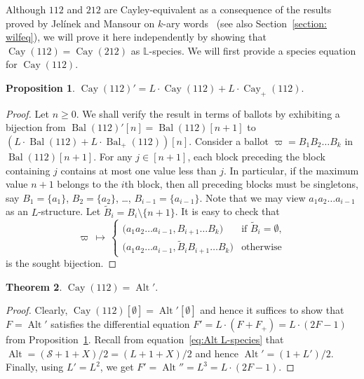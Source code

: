 \documentclass[a4paper, 11pt]{article}
\DeclareMathOperator{\Bal}{Bal}
\DeclareMathOperator{\Cay}{Cay}
\newcommand{\LL}{\mathbb{L}}
\DeclareMathOperator{\Alt}{Alt}
\newcommand{\Sym}{\mathcal{S}}
\theoremstyle{definition}
\newtheorem{theorem}{Theorem}[section]
\newtheorem{proposition}[theorem]{Proposition}
\begin{document}
Although $112$ and $212$ are Cayley-equivalent as a consequence of the results
proved by Jel\'inek and Mansour on $k$-ary words~\cite{k-ary} (see also
Section~\ref{section: wilfeq}), we will prove it here independently by
showing that $\Cay(112) = \Cay(212)$ as $\LL$-species. We will first
provide a species equation for $\Cay(112)$.

\begin{proposition}\label{prop: species equation Cay(112)}
$\Cay(112)' = L \cdot \Cay(112) + L \cdot \Cay_+(112)$. 
\end{proposition}

\begin{proof}
  Let $n\geq 0$.  We shall verify the result in terms of ballots by
  exhibiting a bijection from $\Bal(112)'[n]=\Bal(112)[n+1]$ to
  $(L \cdot \Bal(112) + L \cdot \Bal_+(112))[n]$.  Consider a ballot
  $\varpi=B_1B_2\ldots B_k$ in $\Bal(112)[n+1]$.  For any $j\in [n+1]$,
  each block preceding the block containing $j$ contains at most one
  value less than $j$. In particular, if the maximum value $n+1$ belongs
  to the $i$th block, then all preceding blocks must
  be singletons, say $B_1=\{a_1\}$, $B_2=\{a_2\}$, \dots,
  $B_{i-1}=\{a_{i-1}\}$. Note that we may view $a_1a_2\dots a_{i-1}$ as
  an $L$-structure. Let $\tilde{B}_i = B_i\setminus \{n+1\}$.  It is easy
  to check that
  \[
    \varpi \,\longmapsto\,
    \begin{cases}
      \bigl(a_1a_2\dots a_{i-1}, B_{i+1}\dots B_k \bigr) & \text{if $\tilde{B}_i=\emptyset$},\\
      \bigl(a_1a_2\dots a_{i-1}, \tilde{B}_iB_{i+1}\dots B_k \bigr) & \text{otherwise}
    \end{cases}
  \]
  is the sought bijection.
\end{proof}

\begin{theorem}\label{thm:species 112}
  $\Cay(112) = \Alt'$.
\end{theorem}
\begin{proof}
  Clearly, $\Cay(112)[\emptyset] = \Alt'[\emptyset]$ and hence it suffices
  to show that $F=\Alt'$ satisfies the differential equation
  $F' = L\cdot (F+F_+)=L\cdot (2F-1)$ from Proposition~\ref{prop: species equation Cay(112)}. 
  Recall from equation~\eqref{eq:Alt L-species} that
  $\Alt = (\Sym + 1 + X)/2 = (L + 1 + X)/2$ and hence $\Alt' = (1+L')/2$.
  Finally, using $L'=L^2$, we get
  $F'  = \Alt'' = L^3 = L\cdot (2F-1)$.
\end{proof}
\end{document}
